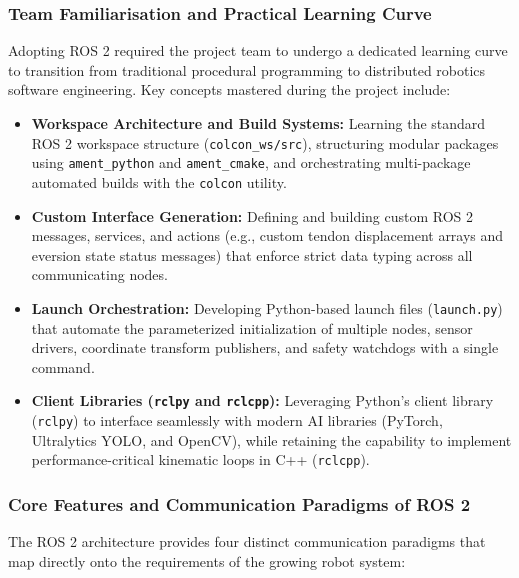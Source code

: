 \subsubsection{Team Familiarisation and Practical Learning Curve}
Adopting ROS 2 required the project team to undergo a dedicated learning curve to transition from traditional procedural programming to distributed robotics software engineering. Key concepts mastered during the project include:

\begin{itemize}
    \item \textbf{Workspace Architecture and Build Systems:} Learning the standard ROS 2 workspace structure (\texttt{colcon\_ws/src}), structuring modular packages using \texttt{ament\_python} and \texttt{ament\_cmake}, and orchestrating multi-package automated builds with the \texttt{colcon} utility.
    \item \textbf{Custom Interface Generation:} Defining and building custom ROS 2 messages, services, and actions (e.g., custom tendon displacement arrays and eversion state status messages) that enforce strict data typing across all communicating nodes.
    \item \textbf{Launch Orchestration:} Developing Python-based launch files (\texttt{launch.py}) that automate the parameterized initialization of multiple nodes, sensor drivers, coordinate transform publishers, and safety watchdogs with a single command.
    \item \textbf{Client Libraries (\texttt{rclpy} and \texttt{rclcpp}):} Leveraging Python's client library (\texttt{rclpy}) to interface seamlessly with modern AI libraries (PyTorch, Ultralytics YOLO, and OpenCV), while retaining the capability to implement performance-critical kinematic loops in C++ (\texttt{rclcpp}).
\end{itemize}

\subsubsection{Core Features and Communication Paradigms of ROS 2}
The ROS 2 architecture provides four distinct communication paradigms that map directly onto the requirements of the growing robot system:

